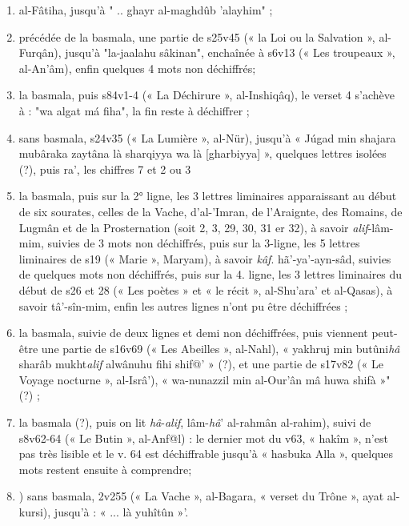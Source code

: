 \begin{enumerate}
   \item al-Fâtiha, jusqu'à
" .. ghayr al-maghdûb 'alayhim" ;
  \item précédée de la basmala, une partie de s25v45 (« la Loi ou la
Salvation », al-Furqân), jusqu'à "la-jaalahu sâkinan", enchaînée à s6v13
(« Les troupeaux », al-An'âm), enfin quelques 4 mots non déchiffrés;
  \item la basmala, puis s84v1-4 (« La Déchirure », al-Inshiqâq), le verset
4 s'achève à : "wa algat má fiha", la fin reste à déchiffrer ;
  \item sans basmala, s24v35 (« La Lumière », al-Nür), jusqu'à « Júgad
min shajara mubâraka zaytâna là sharqiyya wa là [gharbiyya] », quelques lettres isolées (?), puis ra', les chiffres 7 et 2 ou 3
  \item la basmala, puis sur la 2° ligne, les 3 lettres liminaires apparaissant
au début de six sourates, celles de la Vache, d'al-'Imran, de l'Araignte, des Romains, de Lugmân et de la Prosternation (soit 2, 3, 29, 30, 31 er
32), à savoir \textit{alif}-lâm-mim, suivies de 3 mots non déchiffrés, puis sur la 3-ligne, les 5 lettres liminaires de s19 (« Marie », Maryam), à savoir \textit{kâf}.
hã'-ya'-ayn-sâd, suivies de quelques mots non déchiffrés, puis sur la 4. ligne, les 3 lettres liminaires du début de s26 et   28 (« Les poètes » et « le
récit », al-Shu'ara' et al-Qasas), à savoir tâ'-sîn-mim, enfin les autres
lignes n'ont pu être déchiffrées ;
  \item la basmala, suivie de deux lignes et demi non déchiffrées, puis viennent peut-être une partie de s16v69 (« Les Abeilles », al-Nahl),
« yakhruj min butûni\textit{hâ} sharâb mukht\textit{alif} alwânuhu fihi shif@' » (?), et une partie de s17v82 (« Le Voyage nocturne », al-Isrâ'), « wa-nunazzil
min al-Our'ân mâ huwa shifà »" (?) ;
  \item la basmala (?), puis on lit \textit{hâ}-\textit{alif}, lâm-\textit{hâ}' al-rahmân al-rahim), suivi de s8v62-64 (« Le Butin », al-Anf@l) : le dernier mot du v63,
« hakîm », n'est pas très lisible et le v. 64 est déchiffrable jusqu'à « hasbuka Alla », quelques mots restent ensuite à comprendre;
  \item) sans basmala, 2v255 (« La Vache », al-Bagara, « verset du
Trône », ayat al-kursi), jusqu'à : « ... là yuhîtûn »'.
\end{enumerate}


